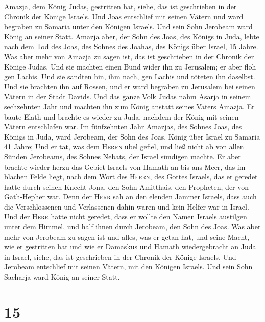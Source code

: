 Amazja, dem König Judas, gestritten hat, siehe, das ist geschrieben in
der Chronik der Könige Israels.  Und Joas entschlief mit
seinen Vätern und ward begraben zu Samaria unter den Königen Israels.
Und sein Sohn Jerobeam ward König an seiner Statt. 
Amazja aber, der Sohn des Joas, des Königs in Juda, lebte nach dem Tod
des Joas, des Sohnes des Joahas, des Königs über Israel, 15 Jahre.
 Was aber mehr von Amazja zu sagen ist, das ist
geschrieben in der Chronik der Könige Judas.  Und sie
machten einen Bund wider ihn zu Jerusalem; er aber floh gen Lachis. Und
sie sandten hin, ihm nach, gen Lachis und töteten ihn daselbst.
 Und sie brachten ihn auf Rossen, und er ward begraben zu
Jerusalem bei seinen Vätern in der Stadt Davids.  Und das
ganze Volk Judas nahm Asarja in seinem sechzehnten Jahr und machten ihn
zum König anstatt seines Vaters Amazja.  Er baute Elath
und brachte es wieder zu Juda, nachdem der König mit seinen Vätern
entschlafen war.  Im fünfzehnten Jahr Amazjas, des Sohnes
Joas, des Königs in Juda, ward Jerobeam, der Sohn des Joas, König über
Israel zu Samaria 41 Jahre;  Und er tat, was dem
\textsc{Herrn} übel gefiel, und ließ nicht ab von allen Sünden
Jerobeams, des Sohnes Nebats, der Israel sündigen machte.
 Er aber brachte wieder herzu das Gebiet Israels von
Hamath an bis ans Meer, das im blachen Felde liegt, nach dem Wort des
\textsc{Herrn}, des Gottes Israels, das er geredet hatte durch seinen
Knecht Jona, den Sohn Amitthais, den Propheten, der von Gath-Hepher war.
 Denn der \textsc{Herr} sah an den elenden Jammer
Israels, dass auch die Verschlossenen und Verlassenen dahin waren und
kein Helfer war in Israel.  Und der \textsc{Herr} hatte
nicht geredet, dass er wollte den Namen Israels austilgen unter dem
Himmel, und half ihnen durch Jerobeam, den Sohn des Joas.
 Was aber mehr von Jerobeam zu sagen ist und alles, was
er getan hat, und seine Macht, wie er gestritten hat und wie er Damaskus
und Hamath wiedergebracht an Juda in Israel, siehe, das ist geschrieben
in der Chronik der Könige Israels.  Und Jerobeam
entschlief mit seinen Vätern, mit den Königen Israels. Und sein Sohn
Sacharja ward König an seiner Statt.

\hypertarget{section-14}{%
\section{15}\label{section-14}}

